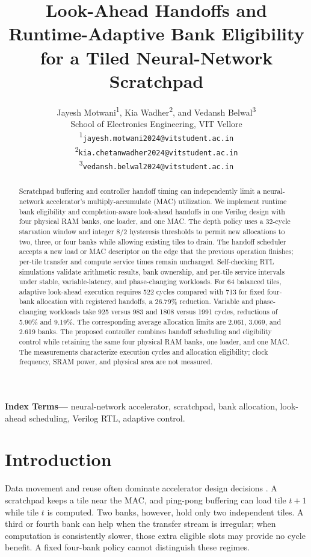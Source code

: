 \documentclass[twocolumn,10pt]{article}
\title{Look-Ahead Handoffs and Runtime-Adaptive Bank Eligibility\\for a Tiled Neural-Network Scratchpad}
\author{Jayesh Motwani\textsuperscript{1}, Kia Wadher\textsuperscript{2},
and Vedansh Belwal\textsuperscript{3}\\
School of Electronics Engineering, VIT Vellore\\[0.25em]
{\small \textsuperscript{1}\texttt{jayesh.motwani2024@vitstudent.ac.in}}\\
{\small \textsuperscript{2}\texttt{kia.chetanwadher2024@vitstudent.ac.in}}\\
{\small \textsuperscript{3}\texttt{vedansh.belwal2024@vitstudent.ac.in}}}
\date{}
\begin{document}
\maketitle
\begin{abstract}
Scratchpad buffering and controller handoff timing can independently limit
a neural-network accelerator's multiply-accumulate (MAC) utilization. We
implement runtime bank eligibility and completion-aware look-ahead handoffs
in one Verilog design with four physical RAM banks, one loader, and one MAC.
The depth policy uses a 32-cycle starvation window and integer 8/2
hysteresis thresholds to permit new allocations to two, three, or four
banks while allowing existing tiles to drain. The handoff scheduler accepts
a new load or MAC descriptor on the edge that the previous operation
finishes; per-tile transfer and compute service times remain unchanged.
Self-checking RTL simulations validate arithmetic results, bank ownership,
and per-tile service intervals under stable, variable-latency, and
phase-changing workloads. For 64 balanced
tiles, adaptive look-ahead execution requires 522 cycles compared with 713
for fixed four-bank allocation with registered handoffs, a 26.79\%
reduction. Variable and phase-changing
workloads take 925 versus 983 and 1808 versus 1991 cycles, reductions of
5.90\% and 9.19\%. The corresponding average allocation limits are 2.061,
3.069, and 2.619 banks. The proposed controller combines handoff scheduling
and eligibility control while retaining the same four physical RAM banks,
one loader, and one MAC. The measurements characterize execution cycles
and allocation eligibility; clock frequency, SRAM power, and physical area
are not measured.
\end{abstract}
\noindent\textbf{Index Terms---} neural-network accelerator, scratchpad,
bank allocation, look-ahead scheduling, Verilog RTL, adaptive control.

\section{Introduction}
Data movement and reuse often dominate accelerator design decisions
\cite{sze2017survey}. A scratchpad keeps a tile near the MAC, and ping-pong
buffering can load tile $t+1$ while tile $t$ is computed. Two banks,
however, hold only two independent tiles. A third or fourth bank can help
when the transfer stream is irregular; when computation is consistently
slower, those extra eligible slots may provide no cycle benefit. A fixed
four-bank policy cannot distinguish these regimes.
\end{document}
